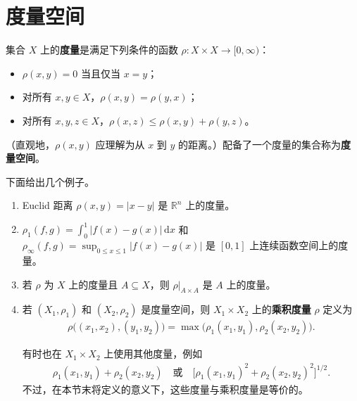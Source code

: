 \documentclass[../../main.tex]{subfiles}%
\begin{document}
\section{度量空间}\label{section:ch00-metric-spaces}


\begin{definition}[度量与度量空间]\label{definition:ch00-metric-definition}
集合 $X$ 上的\textbf{度量}是满足下列条件的函数 $\rho:X\times X\to[0,\infty)$：
\begin{itemize}
\item $\rho(x,y)=0$ 当且仅当 $x=y$；
\item 对所有 $x,y\in X$，$\rho(x,y)=\rho(y,x)$；
\item 对所有 $x,y,z\in X$，$\rho(x,z)\leqslant\rho(x,y)+\rho(y,z)$。
\end{itemize}
（直观地，$\rho(x,y)$ 应理解为从 $x$ 到 $y$ 的距离。）配备了一个度量的集合称为\textbf{度量空间}。
\end{definition}
下面给出几个例子。


\begin{examples}\label{examples:ch00-metric-examples}
\begin{enumerate}[label=\roman*.,ref=(\roman*)]
\item Euclid 距离 $\rho(x,y)=|x-y|$ 是 $\mathbb{R}^n$ 上的度量。
\item $\rho_1(f,g)=\int_0^1|f(x)-g(x)|\,\mathrm{d}x$ 和 $\rho_\infty(f,g)=\sup_{0\leqslant x\leqslant1}|f(x)-g(x)|$ 是 $[0,1]$ 上连续函数空间上的度量。
\item 若 $\rho$ 为 $X$ 上的度量且 $A\subseteq X$，则 $\rho|_{A\times A}$ 是 $A$ 上的度量。
\item 
\begin{definition*}[乘积度量]
若 $(X_1,\rho_1)$ 和 $(X_2,\rho_2)$ 是度量空间，则 $X_1\times X_2$ 上的\textbf{乘积度量} $\rho$ 定义为
\begin{align*}
\rho\bigl((x_1,x_2),(y_1,y_2)\bigr)=\max\bigl(\rho_1(x_1,y_1),\rho_2(x_2,y_2)\bigr).
\end{align*}
\end{definition*}

有时也在 $X_1\times X_2$ 上使用其他度量，例如
\begin{align*}
\rho_1(x_1,y_1)+\rho_2(x_2,y_2)\quad\text{或}\quad
\bigl[\rho_1(x_1,y_1)^2+\rho_2(x_2,y_2)^2\bigr]^{1/2}.
\end{align*}
不过，在本节末将定义的意义下，这些度量与乘积度量是等价的。
\end{enumerate}
\end{examples}
\end{document}
